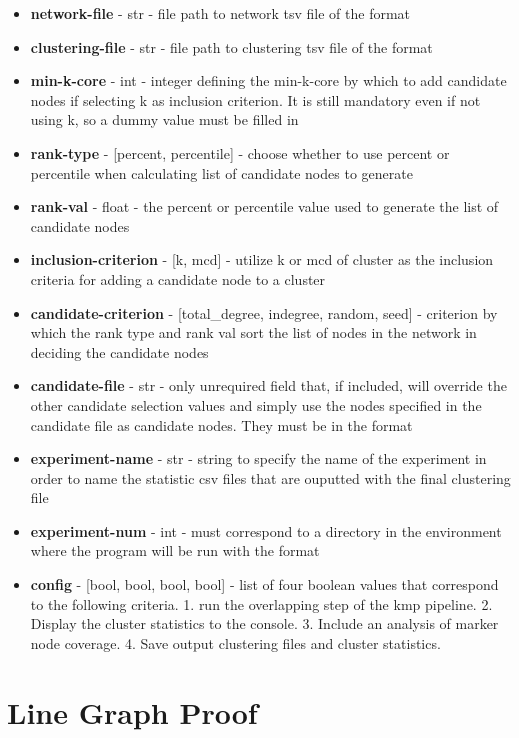 \documentclass[12pt, oneside]{article}   	%
\begin{document}
\begin{itemize}
\item \textbf{network-file} - str  - file path to network tsv file of the format 
\item \textbf{clustering-file} - str - file path to clustering tsv file of the format 
\item \textbf{min-k-core} - int - integer defining the min-k-core by which to add candidate nodes if selecting k as inclusion criterion. It is still mandatory even if not using k, so a dummy value must be filled in
\item \textbf{rank-type} - [percent, percentile] - choose whether to use percent or percentile when calculating list of candidate nodes to generate
\item \textbf{rank-val} - float - the percent or percentile value used to generate the list of candidate nodes
\item \textbf{inclusion-criterion} - [k, mcd] - utilize k or mcd of cluster as the inclusion criteria for adding a candidate node to a cluster
\item \textbf{candidate-criterion} - [total\_degree, indegree, random, seed] - criterion by which the rank type and rank val sort the list of nodes in the network in deciding the candidate nodes
\item \textbf{candidate-file} - str - only unrequired field that, if included, will override the other candidate selection values and simply use the nodes specified in the candidate file as candidate nodes. They must be in the format 
    \item \textbf{experiment-name} - str - string to specify the name of the experiment in order to name the statistic csv files that are ouputted with the final clustering file
    \item \textbf{experiment-num} - int - must correspond to a directory in the environment where the program will be run with the format 
    \item \textbf{config} - [bool, bool, bool, bool] - list of four boolean values that correspond to the following criteria. 1. run the overlapping step of the kmp pipeline. 2. Display the cluster statistics to the console. 3. Include an analysis of marker node coverage. 4. Save output clustering files and cluster statistics. 
\end{itemize}

\section{Line Graph Proof} 
\end{document}
